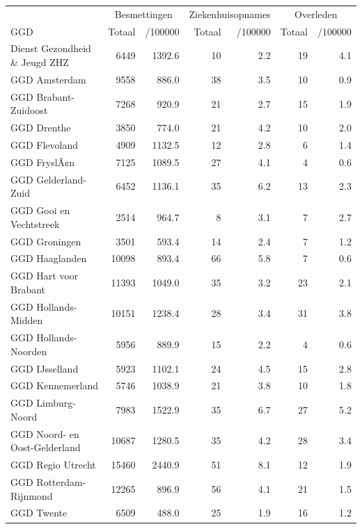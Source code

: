\documentclass[
  english,
  man,floatsintext]{apa6}
\begin{document}
\begin{table}
\centering\begingroup\fontsize{10}{12}\selectfont

\begin{threeparttable}
\begin{tabular}{lrrrrrr}
\toprule
\multicolumn{1}{c}{ } & \multicolumn{2}{c}{Besmettingen} & \multicolumn{2}{c}{Ziekenhuisopnames} & \multicolumn{2}{c}{Overleden} \\
\cmidrule(l{3pt}r{3pt}){2-3} \cmidrule(l{3pt}r{3pt}){4-5} \cmidrule(l{3pt}r{3pt}){6-7}
GGD & Totaal & /100000 & Totaal & /100000 & Totaal & /100000\\
\midrule
Dienst Gezondheid \& Jeugd ZHZ & 6449 & 1392.6 & 10 & 2.2 & 19 & 4.1\\
GGD Amsterdam & 9558 & 886.0 & 38 & 3.5 & 10 & 0.9\\
GGD Brabant-Zuidoost & 7268 & 920.9 & 21 & 2.7 & 15 & 1.9\\
GGD Drenthe & 3850 & 774.0 & 21 & 4.2 & 10 & 2.0\\
GGD Flevoland & 4909 & 1132.5 & 12 & 2.8 & 6 & 1.4\\
GGD FryslÃ¢n & 7125 & 1089.5 & 27 & 4.1 & 4 & 0.6\\
GGD Gelderland-Zuid & 6452 & 1136.1 & 35 & 6.2 & 13 & 2.3\\
GGD Gooi en Vechtstreek & 2514 & 964.7 & 8 & 3.1 & 7 & 2.7\\
GGD Groningen & 3501 & 593.4 & 14 & 2.4 & 7 & 1.2\\
GGD Haaglanden & 10098 & 893.4 & 66 & 5.8 & 7 & 0.6\\
GGD Hart voor Brabant & 11393 & 1049.0 & 35 & 3.2 & 23 & 2.1\\
GGD Hollands-Midden & 10151 & 1238.4 & 28 & 3.4 & 31 & 3.8\\
GGD Hollands-Noorden & 5956 & 889.9 & 15 & 2.2 & 4 & 0.6\\
GGD IJsselland & 5923 & 1102.1 & 24 & 4.5 & 15 & 2.8\\
GGD Kennemerland & 5746 & 1038.9 & 21 & 3.8 & 10 & 1.8\\
GGD Limburg-Noord & 7983 & 1522.9 & 35 & 6.7 & 27 & 5.2\\
GGD Noord- en Oost-Gelderland & 10687 & 1280.5 & 35 & 4.2 & 28 & 3.4\\
GGD Regio Utrecht & 15460 & 2440.9 & 51 & 8.1 & 12 & 1.9\\
GGD Rotterdam-Rijnmond & 12265 & 896.9 & 56 & 4.1 & 21 & 1.5\\
GGD Twente & 6509 & 488.0 & 25 & 1.9 & 16 & 1.2\\

\end{tabular}
\end{threeparttable}
\end{table}
\end{document}
